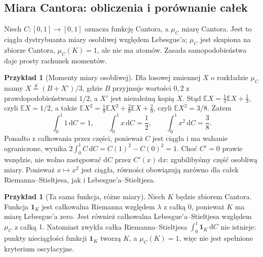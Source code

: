 \documentclass[11pt,a4paper]{article}
\numberwithin{equation}{section}
\theoremstyle{plain}
\theoremstyle{definition}
\newtheorem{przyklad}[twierdzenie]{Przykład}
\theoremstyle{remark}
\newcommand{\ind}[1]{\mathbf 1_{#1}}
\begin{document}
\subsection*{Miara Cantora: obliczenia i porównanie całek}
Niech $C:[0,1]\to[0,1]$ oznacza funkcję Cantora, a $\mu_C$ miarę Cantora. Jest to ciągła dystrybuanta miary osobliwej względem Lebesgue'a; $\mu_C$ jest skupiona na zbiorze Cantora, $\mu_C(K)=1$, ale nie ma atomów. Zasada samopodobieństwa daje prosty rachunek momentów.
\begin{przyklad}[Momenty miary osobliwej]
Dla losowej zmiennej $X$ o rozkładzie $\mu_C$ mamy $X\stackrel d= (B+X')/3$, gdzie $B$ przyjmuje wartości $0,2$ z prawdopodobieństwami $1/2$, a $X'$ jest niezależną kopią $X$. Stąd
$\mathbb E X=\frac13\mathbb E X+\frac13$, czyli $\mathbb E X=1/2$, a także $\mathbb E X^2=\frac19\mathbb E X^2+\frac29\mathbb E X+\frac29$, czyli $\mathbb E X^2=3/8$. Zatem
\[
\int_0^1 1\,\mathrm dC=1,\qquad \int_0^1 x\,\mathrm dC=\frac12,\qquad \int_0^1 x^2\,\mathrm dC=\frac38.
\]
Ponadto z całkowania przez części, ponieważ $C$ jest ciągła i ma wahanie ograniczone, wynika $2\int_0^1 C\,\mathrm dC=C(1)^2-C(0)^2=1$. Choć $C'=0$ prawie wszędzie, nie wolno zastępować $\mathrm dC$ przez $C'(x)\,\mathrm dx$: zgubilibyśmy część osobliwą miary. Ponieważ $x\mapsto x^2$ jest ciągła, równości obowiązują zarówno dla całek Riemanna--Stieltjesa, jak i Lebesgue'a--Stieltjesa.
\end{przyklad}
\begin{przyklad}[Ta sama funkcja, różne miary]
Niech $K$ będzie zbiorem Cantora. Funkcja $\ind K$ jest całkowalna Riemanna względem $\lambda$ z całką $0$, ponieważ $K$ ma miarę Lebesgue'a zero. Jest również całkowalna Lebesgue'a--Stieltjesa względem $\mu_C$ z całką $1$. Natomiast zwykła całka Riemanna--Stieltjesa $\int_0^1\ind K\,\mathrm dC$ nie istnieje: punkty nieciągłości funkcji $\ind K$ tworzą $K$, a $\mu_C(K)=1$, więc nie jest spełnione kryterium oscylacyjne.
\end{przyklad}

\end{document}
